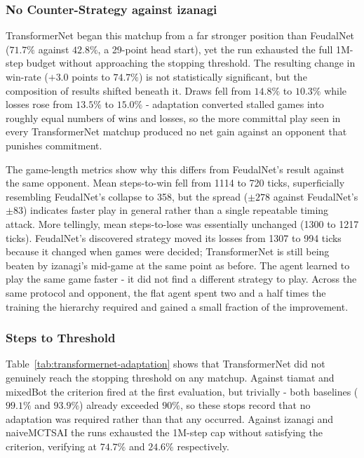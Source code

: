 \documentclass[sigconf,review=false]{acmart}
\begin{document}
\subsubsection{No Counter-Strategy against izanagi}
TransformerNet began this matchup from a far stronger position than FeudalNet ($71.7\%$ against $42.8\%$, a 29-point head start), yet the run exhausted the full 1M-step budget without approaching the stopping threshold.
The resulting change in win-rate ($+3.0$ points to $74.7\%$) is not statistically significant, but the composition of results shifted beneath it. Draws fell from $14.8\%$ to $10.3\%$ while losses rose from $13.5\%$ to $15.0\%$ - adaptation converted stalled games into roughly equal numbers of wins and losses, so the more committal play seen in every TransformerNet matchup produced no net gain against an opponent that punishes commitment.

The game-length metrics show why this differs from FeudalNet's result against the same opponent. Mean steps-to-win fell from 1114 to 720 ticks, superficially resembling FeudalNet's collapse to 358, but the spread ($\pm 278$ against FeudalNet's $\pm 83$) indicates faster play in general rather than a single repeatable timing attack. 
More tellingly, mean steps-to-lose was essentially unchanged (1300 to 1217 ticks). FeudalNet's discovered strategy moved its losses from 1307 to 994 ticks because it changed when games were decided; TransformerNet is still being beaten by izanagi's mid-game at the same point as before. The agent learned to play the same game faster - it did not find a different strategy to play. 
Across the same protocol and opponent, the flat agent spent two and a half times the training the hierarchy required and gained a small fraction of the improvement.

\subsubsection{Steps to Threshold}
Table~\ref{tab:transformernet-adaptation} shows that TransformerNet did not genuinely reach the stopping threshold on any matchup. Against tiamat and mixedBot the criterion fired at the first evaluation, but trivially - both baselines ($99.1\%$ and $93.9\%$) already exceeded $90\%$, so these stops record that no adaptation was required rather than that any occurred. 
Against izanagi and naiveMCTSAI the runs exhausted the 1M-step cap without satisfying the criterion, verifying at $74.7\%$ and $24.6\%$ respectively.
\end{document}

